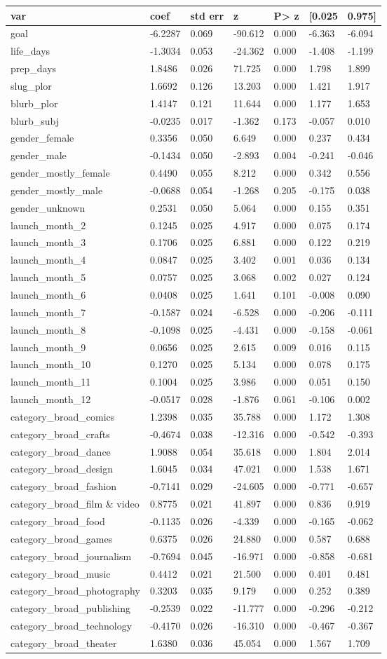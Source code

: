\documentclass[11pt]{article}
\begin{document}
\begin{longtable}[]{@{}lllllll@{}}
\toprule
var & coef & std err & z & P\textgreater{} z & {[}0.025 &
0.975{]}\tabularnewline
\midrule
\endhead
goal & -6.2287 & 0.069 & -90.612 & 0.000 & -6.363 &
-6.094\tabularnewline
life\_days & -1.3034 & 0.053 & -24.362 & 0.000 & -1.408 &
-1.199\tabularnewline
prep\_days & 1.8486 & 0.026 & 71.725 & 0.000 & 1.798 &
1.899\tabularnewline
slug\_plor & 1.6692 & 0.126 & 13.203 & 0.000 & 1.421 &
1.917\tabularnewline
blurb\_plor & 1.4147 & 0.121 & 11.644 & 0.000 & 1.177 &
1.653\tabularnewline
blurb\_subj & -0.0235 & 0.017 & -1.362 & 0.173 & -0.057 &
0.010\tabularnewline
gender\_female & 0.3356 & 0.050 & 6.649 & 0.000 & 0.237 &
0.434\tabularnewline
gender\_male & -0.1434 & 0.050 & -2.893 & 0.004 & -0.241 &
-0.046\tabularnewline
gender\_mostly\_female & 0.4490 & 0.055 & 8.212 & 0.000 & 0.342 &
0.556\tabularnewline
gender\_mostly\_male & -0.0688 & 0.054 & -1.268 & 0.205 & -0.175 &
0.038\tabularnewline
gender\_unknown & 0.2531 & 0.050 & 5.064 & 0.000 & 0.155 &
0.351\tabularnewline
launch\_month\_2 & 0.1245 & 0.025 & 4.917 & 0.000 & 0.075 &
0.174\tabularnewline
launch\_month\_3 & 0.1706 & 0.025 & 6.881 & 0.000 & 0.122 &
0.219\tabularnewline
launch\_month\_4 & 0.0847 & 0.025 & 3.402 & 0.001 & 0.036 &
0.134\tabularnewline
launch\_month\_5 & 0.0757 & 0.025 & 3.068 & 0.002 & 0.027 &
0.124\tabularnewline
launch\_month\_6 & 0.0408 & 0.025 & 1.641 & 0.101 & -0.008 &
0.090\tabularnewline
launch\_month\_7 & -0.1587 & 0.024 & -6.528 & 0.000 & -0.206 &
-0.111\tabularnewline
launch\_month\_8 & -0.1098 & 0.025 & -4.431 & 0.000 & -0.158 &
-0.061\tabularnewline
launch\_month\_9 & 0.0656 & 0.025 & 2.615 & 0.009 & 0.016 &
0.115\tabularnewline
launch\_month\_10 & 0.1270 & 0.025 & 5.134 & 0.000 & 0.078 &
0.175\tabularnewline
launch\_month\_11 & 0.1004 & 0.025 & 3.986 & 0.000 & 0.051 &
0.150\tabularnewline
launch\_month\_12 & -0.0517 & 0.028 & -1.876 & 0.061 & -0.106 &
0.002\tabularnewline
category\_broad\_comics & 1.2398 & 0.035 & 35.788 & 0.000 & 1.172 &
1.308\tabularnewline
category\_broad\_crafts & -0.4674 & 0.038 & -12.316 & 0.000 & -0.542 &
-0.393\tabularnewline
category\_broad\_dance & 1.9088 & 0.054 & 35.618 & 0.000 & 1.804 &
2.014\tabularnewline
category\_broad\_design & 1.6045 & 0.034 & 47.021 & 0.000 & 1.538 &
1.671\tabularnewline
category\_broad\_fashion & -0.7141 & 0.029 & -24.605 & 0.000 & -0.771 &
-0.657\tabularnewline
category\_broad\_film \& video & 0.8775 & 0.021 & 41.897 & 0.000 & 0.836
& 0.919\tabularnewline
category\_broad\_food & -0.1135 & 0.026 & -4.339 & 0.000 & -0.165 &
-0.062\tabularnewline
category\_broad\_games & 0.6375 & 0.026 & 24.880 & 0.000 & 0.587 &
0.688\tabularnewline
category\_broad\_journalism & -0.7694 & 0.045 & -16.971 & 0.000 & -0.858
& -0.681\tabularnewline
category\_broad\_music & 0.4412 & 0.021 & 21.500 & 0.000 & 0.401 &
0.481\tabularnewline
category\_broad\_photography & 0.3203 & 0.035 & 9.179 & 0.000 & 0.252 &
0.389\tabularnewline
category\_broad\_publishing & -0.2539 & 0.022 & -11.777 & 0.000 & -0.296
& -0.212\tabularnewline
category\_broad\_technology & -0.4170 & 0.026 & -16.310 & 0.000 & -0.467
& -0.367\tabularnewline
category\_broad\_theater & 1.6380 & 0.036 & 45.054 & 0.000 & 1.567 &
1.709\tabularnewline
\bottomrule
\end{longtable}
\end{document}
